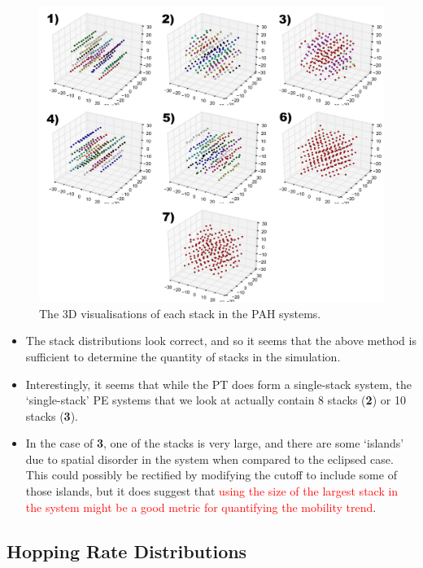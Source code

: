 \documentclass[12pt]{article}
\begin{document}
\begin{figure}[h!]\centering
	\includegraphics[width=\textwidth]{Figures/stacks.pdf}
    \caption{The 3D visualisations of each stack in the PAH systems.}
	\label{fig:stacks}
\end{figure}


\begin{itemize}
    \item{The stack distributions look correct, and so it seems that the above method is sufficient to determine the quantity of stacks in the simulation.}
    \item{Interestingly, it seems that while the PT does form a single-stack system, the `single-stack' PE systems that we look at actually contain 8 stacks (\textbf{2}) or 10 stacks (\textbf{3}).}
    \item{In the case of \textbf{3}, one of the stacks is very large, and there are some `islands' due to spatial disorder in the system when compared to the eclipsed case. This could possibly be rectified by modifying the cutoff to include some of those islands, but it does suggest that \textcolor{red}{using the size of the largest stack in the system might be a good metric for quantifying the mobility trend}.}
\end{itemize}

\clearpage

\subsection{Hopping Rate Distributions}
\end{document}
